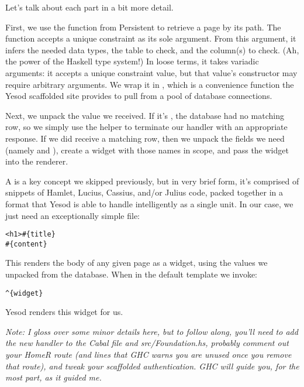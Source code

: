 Let's talk about each part in a bit more detail.

First, we use the  function from Persistent to retrieve a page by its path. The  function accepts a unique constraint as its sole argument. From this argument, it infers the needed data types, the table to check, and the column(s) to check. (Ah, the power of the Haskell type system!) In loose terms, it takes variadic arguments: it accepts a unique constraint value, but that value's constructor may require arbitrary arguments. We wrap it in , which is a convenience function the Yesod scaffolded site provides to pull from a pool of database connections.

Next, we unpack the  value we received. If it's , the database had no matching row, so we simply use the  helper to terminate our handler with an appropriate response. If we did receive a matching row, then we unpack the fields we need (namely  and ), create a widget with those names in scope, and pass the widget into the  renderer.

A  is a key concept we skipped previously, but in very brief form, it's comprised of snippets of Hamlet, Lucius, Cassius, and/or Julius code, packed together in a format that Yesod is able to handle intelligently as a single unit. In our case, we just need an exceptionally simple  file:

\begin{Verbatim}
<h1>#{title}
#{content}
\end{Verbatim}

This renders the body of any given page as a widget, using the values we unpacked from the database. When in the default template we invoke:

\begin{Verbatim}
^{widget}
\end{Verbatim}

Yesod renders this widget for us.

\emph{Note: I gloss over some minor details here, but to follow along, you'll need to add the new handler to the Cabal file and src/Foundation.hs, probably comment out your HomeR route (and lines that GHC warns you are unused once you remove that route), and tweak your scaffolded authentication. GHC will guide you, for the most part, as it guided me.}


